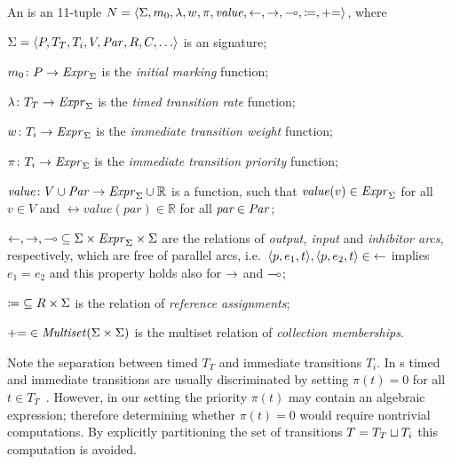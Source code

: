 \begin{dfn}\label{dfn:rgspn:impl}
  An \emph{} is an 11-tuple \(N = \langle \Sigma, m_0, \lambda, w, \pi, \textrm{\itshape value\/}, {\leftarrow}, {\rightarrow}, {\multimap}, {\coloneq}, {\mathrel{{+}{=}}} \rangle\), where
  \begin{compactitem}
  \item \(\Sigma = \langle P, T_T, T_i, V, \textrm{\itshape Par\/}, R, C, \ldots\rangle\) is an  signature;
  \item \(m_0 \colon P \to \textrm{\itshape Expr\/}_\Sigma\) is the \emph{initial marking} function;
  \item \(\lambda \colon T_T \to \textrm{\itshape Expr\/}_\Sigma\) is the \emph{timed transition rate} function;
  \item \(w\colon T_i \to \textrm{\itshape Expr\/}_\Sigma\) is the \emph{immediate transition weight} function;
  \item \(\pi\colon T_i \to \textrm{\itshape Expr\/}_\Sigma\) is the \emph{immediate transition priority} function;
  \item \(\textrm{\itshape value\/}\colon V \cup \textrm{\itshape Par\/} \to \textrm{\itshape Expr\/}_\Sigma \cup \mathbb{R}\) is a function, such that \(\textrm{\itshape value\/}(v) \in \textrm{\itshape Expr\/}_\Sigma\) for all \(v \in V\) and \(\rel{value}(\textit{par}) \in \mathbb{R}\) for all \(\textit{par} \in \textrm{\itshape Par\/}\);
  \item \({\leftarrow}, {\rightarrow}, {\multimap} \subseteq \Sigma \times \textrm{\itshape Expr\/}_\Sigma \times \Sigma\) are the relations of \emph{output, input} and \emph{inhibitor arcs}, respectively, which are free of parallel arcs, i.e.~\(\langle p, e_1, t \rangle, \langle p, e_2, t \rangle \in {\leftarrow}\) implies \(e_1 = e_2\) and this property holds also for \(\rightarrow\) and \(\multimap\);
  \item \({\coloneq} \subseteq R \times \Sigma\) is the relation of \emph{reference assignments};
  \item \({\mathrel{{+}{=}}} \in \textrm{\itshape Multiset\/}(\Sigma \times \Sigma)\) is the multiset relation of \emph{collection memberships}.
  \end{compactitem}
\end{dfn}

Note the separation between timed \(T_T\) and immediate transitions \(T_i\). In s timed and immediate transitions are usually discriminated by setting \(\pi(t) = 0\) for all \(t \in T_T\)~\citep{Marsan84gspn}. However, in our setting the priority \(\pi(t)\) may contain an algebraic expression; therefore determining whether \(\pi(t) = 0\) would require nontrivial computations. By explicitly partitioning the set of transitions \(T = T_T \sqcup T_i\) this computation is avoided.
 
